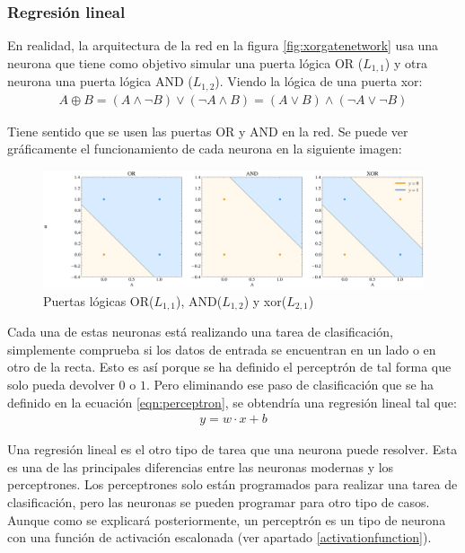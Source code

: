 \subsubsection{Regresión lineal}


En realidad, la arquitectura de la red en la figura \ref{fig:xorgatenetwork} usa una neurona que tiene como objetivo simular una puerta lógica OR ($L_{1,1}$) y otra neurona una puerta lógica AND ($L_{1,2}$). Viendo la lógica de una puerta \acrshort{xor}:
\begin{eqnarray}
    A \oplus B = (A \land \neg B) \lor (\neg A \land B) = (A \lor B) \land (\neg A \lor \neg B)
\end{eqnarray}

Tiene sentido que se usen las puertas OR y AND en la red. Se puede ver gráficamente el funcionamiento de cada neurona en la siguiente imagen:
\begin{figure}[H]
    \centering
    \includegraphics[width=15cm]{images/state-of-art/regression/xor.png}
    \caption{Puertas lógicas OR($L_{1,1}$), AND($L_{1,2}$) y \acrshort{xor}($L_{2,1}$)}
    \label{fig:orandxorgraph}
\end{figure}

Cada una de estas neuronas está realizando una tarea de clasificación, simplemente comprueba si los datos de entrada se encuentran en un lado o en otro de la recta. Esto es así porque se ha definido el perceptrón de tal forma que solo pueda devolver $0$ o $1$. Pero eliminando ese paso de clasificación que se ha definido en la ecuación \ref{eqn:perceptron}, se obtendría una regresión lineal tal que:
\begin{eqnarray}
  y = w \cdot x + b
      \label{eqn:neuronsimple}
\end{eqnarray}

Una regresión lineal es el otro tipo de tarea que una neurona puede resolver. Esta es una de las principales diferencias entre las neuronas modernas y los perceptrones. Los perceptrones solo están programados para realizar una tarea de clasificación, pero las neuronas se pueden programar para otro tipo de casos. Aunque como se explicará posteriormente, un perceptrón es un tipo de neurona con una función de activación escalonada (ver apartado \ref{activationfunction}).
\newline

